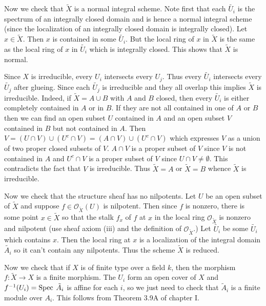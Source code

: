 \documentclass[12pt]{article}
\newcommand{\so}{\mathcal{O}}
\newcommand{\spec}{\mbox{\rm Spec \hspace{.01in}}}
\begin{document}
Now we check that $\tilde{X}$ is a normal integral scheme. 
Note first that each $\tilde{U_i}$ is the spectrum of
an integrally closed domain and is hence a normal integral
scheme (since the localization of an integrally closed
domain is integrally closed). 
Let $x\in\tilde{X}$. Then $x$ is contained in some $\tilde{U_i}$.
But the local ring of $x$ in $\tilde{X}$ is the same as the
local ring of $x$ in $\tilde{U_i}$ which is integrally closed.
This shows that $\tilde{X}$ is normal. 

Since $X$ is irreducible,
every $U_i$ intersects every $U_j$. Thus every $\tilde{U_i}$
intersects every $\tilde{U_j}$ after glueing.  
Since each $\tilde{U_j}$ is irreducible and they all overlap
this implies $\tilde{X}$ is irreducible. Indeed, if $\tilde{X}=A\cup B$
with $A$ and $B$ closed, then every $\tilde{U_i}$ is either completely
contained in $A$ or in $B$. If they are not all contained in one of
$A$ or $B$ then we can find an open subset $U$ contained in $A$ 
and an open subset $V$ contained in $B$ but not contained in $A$. Then 
$V=(U\cap V)\cup(U^c\cap V)
  =(A\cap V)\cup(U^c\cap V)$
which expresses $V$ as a union of two proper closed subsets of $V$.
$A\cap V$ is a proper subset of $V$ since $V$ is not contained in
$A$ and $U^c\cap V$ is a proper subset of $V$ since 
$U\cap V\not=\emptyset$. This contradicts the fact that $V$ is
irreducible. Thus $\tilde{X}=A$ or $\tilde{X}=B$ whence $\tilde{X}$
is irreducible. 

Now we check that the structure sheaf has no nilpotents.
Let $U$ be an open subset of $\tilde{X}$ and suppose
$f\in\so_{\tilde{X}}(U)$ is nilpotent. Then since $f$ is
nonzero, there is some point $x\in \tilde{X}$ so that the
stalk $f_x$ of $f$ at $x$ in the local ring $\so_{\tilde{X}}$ is
nonzero and nilpotent (use sheaf axiom (iii) and the definition of
$\so_{\tilde{X}}$.) Let $\tilde{U_i}$ be some $\tilde{U_i}$ 
which contains $x$. Then the local ring at $x$ is a localization
of the integral domain $\tilde{A_i}$ so it can't contain any
nilpotents. Thus the scheme $\tilde{X}$ is reduced.
  
Now we check that if $X$ is of finite type over a field $k$, then 
the morphism $f:\tilde X\rightarrow X$ is a finite morphism. 
The $U_i$ form an open cover of $X$ and $f^{-1}(U_i)=\spec \tilde A_i$
is affine for each $i$, so we just need to check that
$\tilde A_i$ is a finite module over $A_i$. This follows from
Theorem 3.9A of chapter I.  
\end{document}
